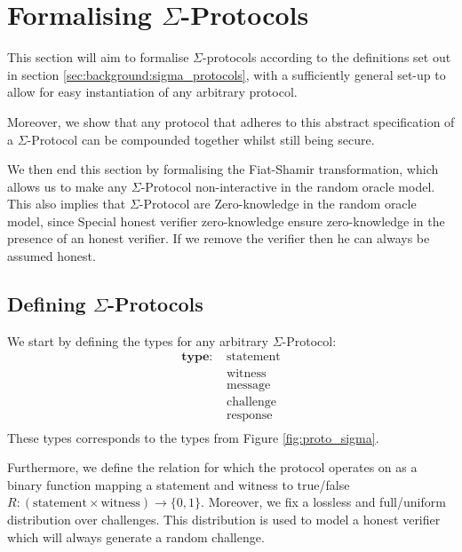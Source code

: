 \chapter{Formalising $\Sigma$-Protocols}
\label{ch:formal_sigma}
This section will aim to formalise $\Sigma$-protocols according to the
definitions set out in section \ref{sec:background:sigma_protocols}, with a
sufficiently general set-up to allow for easy instantiation of any arbitrary
protocol.

Moreover, we show that any protocol that adheres to this abstract specification
of a $\Sigma$-Protocol can be compounded together whilst still being secure.

We then end this section by formalising the Fiat-Shamir transformation, which allows
us to make any $\Sigma$-Protocol non-interactive in the random oracle model.
This also implies that $\Sigma$-Protocol are Zero-knowledge in the random oracle
model, since Special honest verifier zero-knowledge ensure zero-knowledge in the
presence of an honest verifier. If we remove the verifier then he can always be
assumed honest.


\section{Defining $\Sigma$-Protocols}
\label{sec:sigma:def}
We start by defining the types for any arbitrary $\Sigma$-Protocol:
\begin{align*}
  \textbf{type: } &\text{statement} \\
                  &\text{witness} \\
                  &\text{message} \\
                  &\text{challenge} \\
                  &\text{response} \\
\end{align*}
These types corresponds to the types from Figure \ref{fig:proto_sigma}.

Furthermore, we define the relation for which the protocol operates on as a
binary function mapping a statement and witness to true/false
$R : (\text{statement} \times \text{witness}) \rightarrow \{0,1\}$.
Moreover, we fix a lossless and full/uniform distribution over challenges. This
distribution is used to model a honest verifier which will always generate a random challenge.

